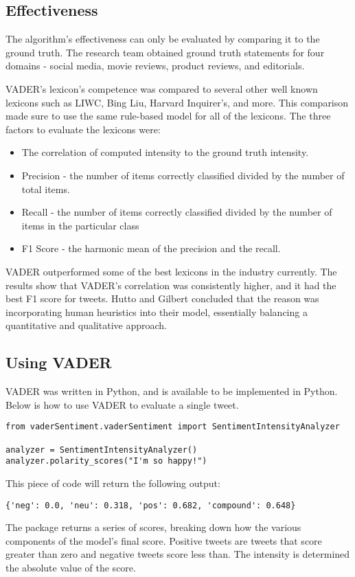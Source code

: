 \documentclass[11pt, twoside, reqno]{article}
\begin{document}
\subsection{Effectiveness}
\hspace{0.2in} The algorithm's effectiveness can only be evaluated by comparing it to the ground truth. The research team obtained ground truth statements for four domains - social media, movie reviews, product reviews, and editorials. 

VADER's lexicon's competence was compared to several other well known lexicons such as LIWC, Bing Liu, Harvard Inquirer's, and more. This comparison made sure to use the same rule-based model for all of the lexicons. The three factors to evaluate the lexicons were:
\begin{itemize}
	\item The correlation of computed intensity to the ground truth intensity. 
	\item Precision - the number of items correctly classified divided by the number of total items. 
	\item Recall - the number of items correctly classified divided by the number of items in the particular class
	\item F1 Score - the harmonic mean of the precision and the recall.
\end{itemize}

VADER outperformed some of the best lexicons in the industry currently. The results show that VADER's correlation was consistently higher, and it had the best F1 score for tweets. Hutto and Gilbert concluded that the reason was incorporating human heuristics into their model, essentially balancing a quantitative and qualitative approach. 

\subsection{Using VADER}
\hspace{0.2in}VADER was written in Python, and is available to be implemented in Python. Below is how to use VADER to evaluate a single tweet. 
\begin{verbatim}
from vaderSentiment.vaderSentiment import SentimentIntensityAnalyzer

analyzer = SentimentIntensityAnalyzer()
analyzer.polarity_scores("I'm so happy!")
\end{verbatim}
This piece of code will return the following output:
\begin{verbatim}
{'neg': 0.0, 'neu': 0.318, 'pos': 0.682, 'compound': 0.648}
\end{verbatim}
The package returns a series of scores, breaking down how the various components of the model's final score. Positive tweets are tweets that score greater than zero and negative tweets score less than. The intensity is determined the absolute value of the score. 
\end{document}
